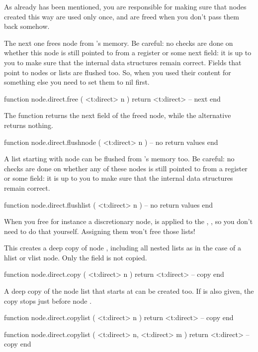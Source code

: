 As already has been mentioned, you are responsible for making sure that nodes
created this way are used only once, and are freed when you don't pass them
back somehow.

The next one frees node  from \TEX's memory. Be careful: no checks are
done on whether this node is still pointed to from a register or some \type
{next} field: it is up to you to make sure that the internal data structures
remain correct. Fields that point to nodes or lists are flushed too. So, when
you used their content for something else you need to set them to nil first.

\starttyping[option=LUA]
function node.direct.free ( <t:direct> n )
    return <t:direct> -- next
end
\stoptyping

The  function returns the next field of the freed node, while the
 alternative returns nothing.

\starttyping[option=LUA]
function node.direct.flushnode ( <t:direct> n )
    -- no return values
end
\stoptyping

A list starting with node  can be flushed from \TEX's memory too. Be
careful: no checks are done on whether any of these nodes is still pointed to
from a register or some  field: it is up to you to make sure that the
internal data structures remain correct.

\starttyping[option=LUA]
function node.direct.flushlist ( <t:direct> n )
    -- no return values
end
\stoptyping

When you free for instance a discretionary node,  is applied to
the , ,  so you don't need to do that
yourself. Assigning them  won't free those lists!

This creates a deep copy of node , including all nested lists as in the case
of a hlist or vlist node. Only the  field is not copied.

\starttyping[option=LUA]
function node.direct.copy ( <t:direct> n )
    return <t:direct> -- copy
end
\stoptyping

A deep copy of the node list that starts at  can be created too. If
 is also given, the copy stops just before node .

\starttyping[option=LUA]
function node.direct.copylist ( <t:direct> n )
    return <t:direct> -- copy
end

function node.direct.copylist ( <t:direct> n, <t:direct> m )
    return <t:direct> -- copy
end
\stoptyping

